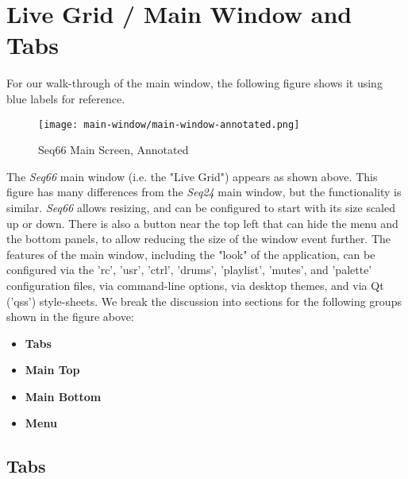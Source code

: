 %
%
%

\section{Live Grid / Main Window and Tabs}
\label{sec:live_grid}

   For our walk-through of the main window, the following figure
   shows it using blue labels for reference.

\begin{figure}[H]
   \centering 
   \texttt{[image: main-window/main-window-annotated.png]}
   \caption{Seq66 Main Screen, Annotated}
   \label{fig:main_screen_annotated}
\end{figure}

   The \textsl{Seq66} main window (i.e. the "Live Grid") appears as shown above.
   This figure has many differences from the \textsl{Seq24} main window,
   but the functionality is similar.
   \textsl{Seq66} allows resizing, and can
   be configured to start with its size scaled up or down.
   There is also a button near the top left that can
   hide the menu and the bottom panels, to allow reducing the
   size of the window event further.
   The features of the main window, including the "look" of the application,
   can be configured via the 'rc', 'usr', 'ctrl', 'drums', 'playlist', 'mutes',
   and 'palette' configuration files, via command-line options, via
   desktop themes, and via Qt ('qss') style-sheets.
   We break the discussion into sections for the following
   groups shown in the figure above:

   \begin{itemize}
      \item \textbf{Tabs}
      \item \textbf{Main Top}
      \item \textbf{Main Bottom}
      \item \textbf{Menu}
   \end{itemize}

\subsection{Tabs}
\label{subsec:introduction_main_tabs}

